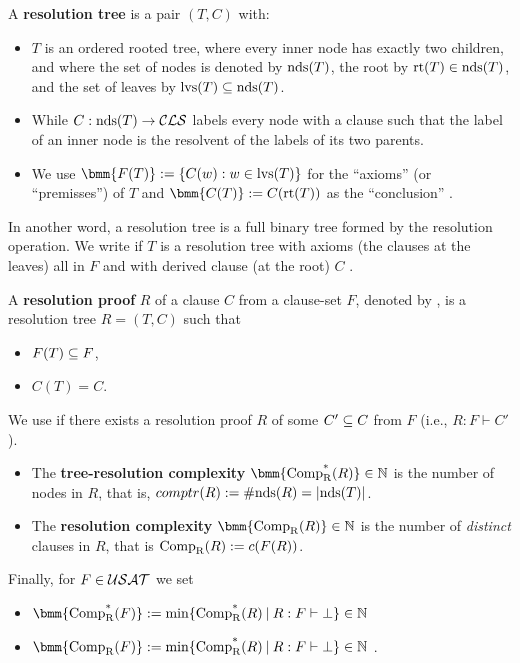 \documentclass[12pt]{book}
\begin{document}
\begin{defi}\label{def:restree}
  A \textbf{resolution tree} is a pair $(T,C)$ with:
  \begin{itemize}
  \item $T$ is an ordered rooted tree, where every inner node has exactly two children, and where the set of nodes is denoted 
  by $\operatorname{nds}(T)$, the root by $\operatorname{rt}(T) \in \operatorname{nds}(T)$, and the set of leaves by $\operatorname{lvs}(T) \subseteq \operatorname{nds}(T)$.
  \item While $C: \operatorname{nds}(T) \rightarrow \mathcal{CLS}$ labels every node with a clause such that the label of an inner node is the resolvent of the labels of its two parents.
  \item We use $\bmm{F(T)} := \set{C(w) : w \in \lvs(T)}$ for the ``axioms'' (or ``premisses'') of $T$ and $\bmm{C(T)} := C(\rt(T))$ as the ``conclusion'' \cite{h5}.
  \end{itemize}
\end{defi}
In another word, a resolution tree is a full binary tree formed by the resolution operation. We write  if $T$ is a 
resolution tree with axioms (the clauses at the leaves) all in $F$ and with derived clause (at the root) $C$ \cite{h11}. 
\begin{defi}\label{def:resproof}
  A \textbf{resolution proof} $R$ of a clause $C$ from a clause-set $F$, denoted by , is a resolution tree $R = (T,C)$ such that
  \begin{itemize}
  \item $F(T) \subseteq F$,
  \item $C(T) = C$.
  \end{itemize}
  We use  if there exists a resolution proof $R$ of some $C' \subseteq C$ from $F$ (i.e., $R: F \vdash C'$). 
  \begin{itemize}
  \item The \textbf{tree-resolution complexity} $\bmm{\comptr(R)} \in \NN$ is the number of nodes in $R$, that is, $comptr(R) := \operatorname{\#nds}(R) = \lvert \operatorname{nds}(T) \rvert$.
  \item The \textbf{resolution complexity} $\bmm{\compr(R)} \in \NN$ is the number of \emph{distinct} clauses in $R$, that is $\operatorname{\operatorname{Comp}_R}(R) := c(F(R))$.
  \end{itemize}
  Finally, for $F \in \mathcal{USAT}$ we set
  \begin{itemize}
  \item $\bmm{\comptr(F)} := \min \set{\comptr(R) \mb R : F \vdash \bot} \in \NN$
  \item $\bmm{\compr(F)} := \min \set{\comptr(R) \mb R : F \vdash \bot} \in \NN$ \cite{h5}.
  \end{itemize}
\end{defi}
\end{document}
